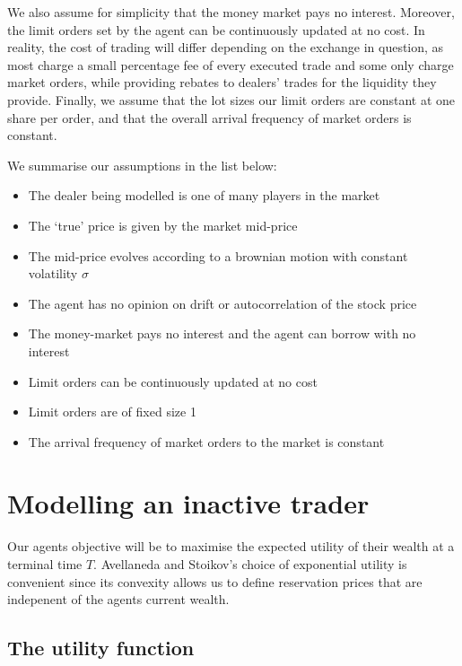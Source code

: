 We also assume for simplicity that the money market pays no interest. Moreover, the
limit orders set by the agent can be continuously updated at no cost. In reality, 
the cost of trading will differ depending on the exchange in question, as most
charge a small percentage fee of every executed trade and some only charge market orders,
while providing rebates to dealers' trades for the liquidity they provide. Finally,
we assume that the lot sizes our limit orders are constant at one share per order,
and that the overall arrival frequency of market orders is constant.

We summarise our assumptions in the list below:

\begin{itemize}
    \item The dealer being modelled is one of many players in the market
    \item The `true' price is given by the market mid-price
    \item The mid-price evolves according to a brownian motion with constant volatility $\sigma$
    \item The agent has no opinion on drift or autocorrelation of the stock price
    \item The money-market pays no interest and the agent can borrow with no interest
    \item Limit orders can be continuously updated at no cost
    \item Limit orders are of fixed size 1
    \item The arrival frequency of market orders to the market is constant
\end{itemize}

\section{Modelling an inactive trader}\label{sec:3.3}

Our agents objective will be to maximise the expected utility of their wealth at 
a terminal time $T$. Avellaneda and Stoikov's choice of exponential utility is 
convenient since its convexity allows us to define reservation prices that are 
indepenent of the agents current wealth.

\subsection*{The utility function}

